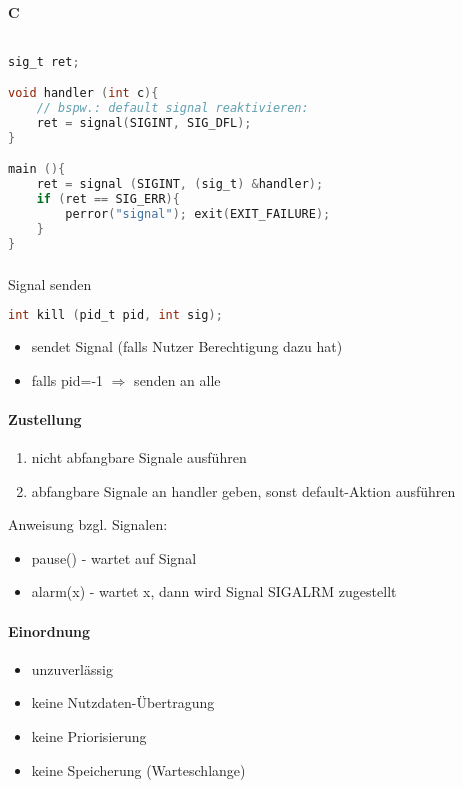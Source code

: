 \paragraph{C} $ $
\begin{lstlisting}[language=C]
sig_t ret;

void handler (int c){
	// bspw.: default signal reaktivieren:
	ret = signal(SIGINT, SIG_DFL);
}

main (){
	ret = signal (SIGINT, (sig_t) &handler);
	if (ret == SIG_ERR){
		perror("signal"); exit(EXIT_FAILURE);
	}
}
\end{lstlisting}

\subsubsection[kill]{}
Signal senden
\begin{lstlisting}[language=C]
int kill (pid_t pid, int sig);
\end{lstlisting}
\begin{itemize}
\item sendet Signal (falls Nutzer Berechtigung dazu hat)
\item falls pid=-1 $\Rightarrow$ senden an alle
\end{itemize}
\paragraph{Zustellung}
\begin{enumerate}
\item nicht abfangbare Signale ausführen
\item abfangbare Signale an handler geben, sonst default-Aktion ausführen
\end{enumerate}
Anweisung bzgl. Signalen:
\begin{itemize}
\item pause() - wartet auf Signal
\item alarm(x) - wartet x, dann wird Signal SIGALRM zugestellt
\end{itemize}
\paragraph{Einordnung}
\begin{itemize}
\item unzuverlässig
\item keine Nutzdaten-Übertragung
\item keine Priorisierung
\item keine Speicherung (Warteschlange)
\end{itemize}

